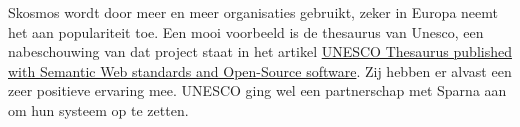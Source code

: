 Skosmos wordt door meer en meer organisaties gebruikt, zeker in Europa neemt het aan populariteit toe. Een mooi voorbeeld is de thesaurus van Unesco, een nabeschouwing van dat project staat in het artikel  \href{http://blog.sparna.fr/2017/02/06/unesco-thesaurus-published-with-semantic-web-standards-and-open-source-software/}{UNESCO Thesaurus published with Semantic Web standards and Open-Source software}. Zij hebben er alvast een zeer positieve ervaring mee. UNESCO ging wel een partnerschap met Sparna aan om hun systeem op te zetten. 



